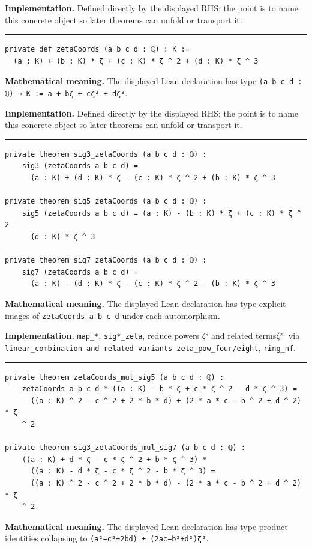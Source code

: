 \documentclass[UTF8,a4paper,11pt,fontset=fandol]{ctexart}
\theoremstyle{definition}
\newcommand{\statementsep}{\par\medskip\hrule\medskip}
\begin{document}
\noindent\textbf{Implementation.} Defined directly by the displayed RHS; the point is to name this concrete object so later theorems can unfold or transport it.\par
\statementsep
\begin{verbatim}
private def zetaCoords (a b c d : ℚ) : K :=
  (a : K) + (b : K) * ζ + (c : K) * ζ ^ 2 + (d : K) * ζ ^ 3
\end{verbatim}
\noindent\textbf{Mathematical meaning.} The displayed Lean declaration has type \texttt{(a b c d : ℚ) → K := a + bζ + cζ² + dζ³}.\par
\noindent\textbf{Implementation.} Defined directly by the displayed RHS; the point is to name this concrete object so later theorems can unfold or transport it.\par
\statementsep
\begin{verbatim}
private theorem sig3_zetaCoords (a b c d : ℚ) :
    sig3 (zetaCoords a b c d) =
      (a : K) + (d : K) * ζ - (c : K) * ζ ^ 2 + (b : K) * ζ ^ 3

private theorem sig5_zetaCoords (a b c d : ℚ) :
    sig5 (zetaCoords a b c d) = (a : K) - (b : K) * ζ + (c : K) * ζ ^ 2 -
      (d : K) * ζ ^ 3

private theorem sig7_zetaCoords (a b c d : ℚ) :
    sig7 (zetaCoords a b c d) =
      (a : K) - (d : K) * ζ - (c : K) * ζ ^ 2 - (b : K) * ζ ^ 3
\end{verbatim}
\noindent\textbf{Mathematical meaning.} The displayed Lean declaration has type explicit images of \texttt{zetaCoords a b c d} under each automorphism.\par
\noindent\textbf{Implementation.} \texttt{map\_\allowbreak{}*}, \texttt{sig*\_\allowbreak{}zeta}, reduce powers ζ⁵ and related termsζ²¹ via \texttt{linear\_\allowbreak{}combination and related variants zeta\_\allowbreak{}pow\_\allowbreak{}four/\allowbreak{}eight}, \texttt{ring\_\allowbreak{}nf}.\par
\statementsep
\begin{verbatim}
private theorem zetaCoords_mul_sig5 (a b c d : ℚ) :
    zetaCoords a b c d * ((a : K) - b * ζ + c * ζ ^ 2 - d * ζ ^ 3) =
      ((a : K) ^ 2 - c ^ 2 + 2 * b * d) + (2 * a * c - b ^ 2 + d ^ 2) * ζ
    ^ 2

private theorem sig3_zetaCoords_mul_sig7 (a b c d : ℚ) :
    ((a : K) + d * ζ - c * ζ ^ 2 + b * ζ ^ 3) *
      ((a : K) - d * ζ - c * ζ ^ 2 - b * ζ ^ 3) =
      ((a : K) ^ 2 - c ^ 2 + 2 * b * d) - (2 * a * c - b ^ 2 + d ^ 2) * ζ
    ^ 2
\end{verbatim}
\noindent\textbf{Mathematical meaning.} The displayed Lean declaration has type product identities collapsing to \texttt{(a²−c²+2bd) ± (2ac−b²+d²)ζ²}.\par
\end{document}
